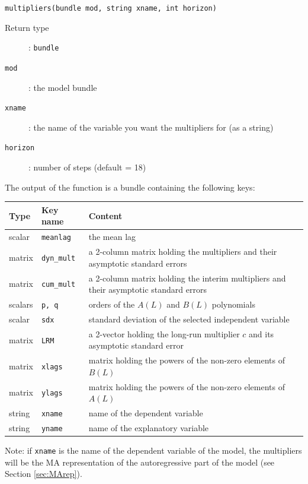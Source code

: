 \documentclass[a4paper,10pt]{article}
\newenvironment{funcdoc}[1]
{\noindent\hrulefill\newline\texttt{#1}\par\noindent\hrulefill\par\medskip\par}
{\bigskip}
\begin{document}
\begin{funcdoc}{multipliers(bundle mod, string xname, int horizon)}
  \begin{description}
  \item[Return type]: \texttt{bundle}
  \item[\texttt{mod}]: the model bundle
  \item[\texttt{xname}]: the name of the variable you want the
    multipliers for (as a string)
  \item[\texttt{horizon}]: number of steps (default = 18)
\end{description}
%

\noindent The output of the function is a bundle containing the
following keys:

\medskip
\begin{center}
\begin{tabular}{llp{}}
  \hline
  \textbf{Type} & \textbf{Key name} & \textbf{Content} \\
  \hline
  scalar & \texttt{meanlag} & the mean lag \\
  matrix & \texttt{dyn\_mult} & a 2-column matrix holding the multipliers
                           and their asymptotic standard errors \\ 
  matrix & \texttt{cum\_mult} & a 2-column matrix holding the interim multipliers
                           and their asymptotic standard errors \\ 
  scalars & \texttt{p, q} & orders of the $A(L)$ and $B(L)$ polynomials \\
  scalar & \texttt{sdx} & standard deviation of the selected
                          independent variable \\
  matrix & \texttt{LRM} & a 2-vector holding the long-run multiplier
                          $c$ and its asymptotic standard error \\ 
  matrix & \texttt{xlags} & matrix holding the powers of the non-zero
                            elements of $B(L)$ \\ 
  matrix & \texttt{ylags} & matrix holding the powers of the non-zero
                            elements of $A(L)$ \\ 
  string & \texttt{xname} & name of the dependent variable \\ 
  string & \texttt{yname} & name of the explanatory variable \\ 
  \hline
\end{tabular}

\end{center}
Note: if \texttt{xname} is the name of the dependent variable of
the model, the multipliers will be the MA representation of the
autoregressive part of the model (see Section \ref{sec:MArep}). 
\end{funcdoc}
\end{document}
